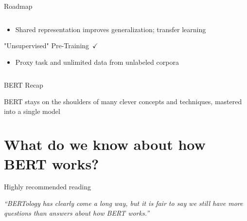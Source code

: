 \documentclass[12pt]{beamer}
\begin{document}
\begin{frame}{Roadmap}
\begin{columns}
\begin{column}{0.5\linewidth}
\begin{itemize}
	\item {\scriptsize Shared representation improves generalization; transfer learning}
\end{itemize}

"Unsupervised" Pre-Training $\checkmark$

\begin{itemize}
	\item {\scriptsize Proxy task and unlimited data from unlabeled corpora}
\end{itemize}

\end{column}

\end{columns}

\end{frame}


\begin{frame}{BERT Recap}
	
	BERT stays on the shoulders of many clever concepts and techniques, mastered into a single model
	
\end{frame}

\section{What do we know about how BERT works?}

\begin{frame}{Highly recommended reading}
	
	\emph{``BERTology has clearly come a long way, but it is fair to say we still have more questions than answers about how BERT works.''}
	
	\bigskip
	
	
\end{frame}
\end{document}

